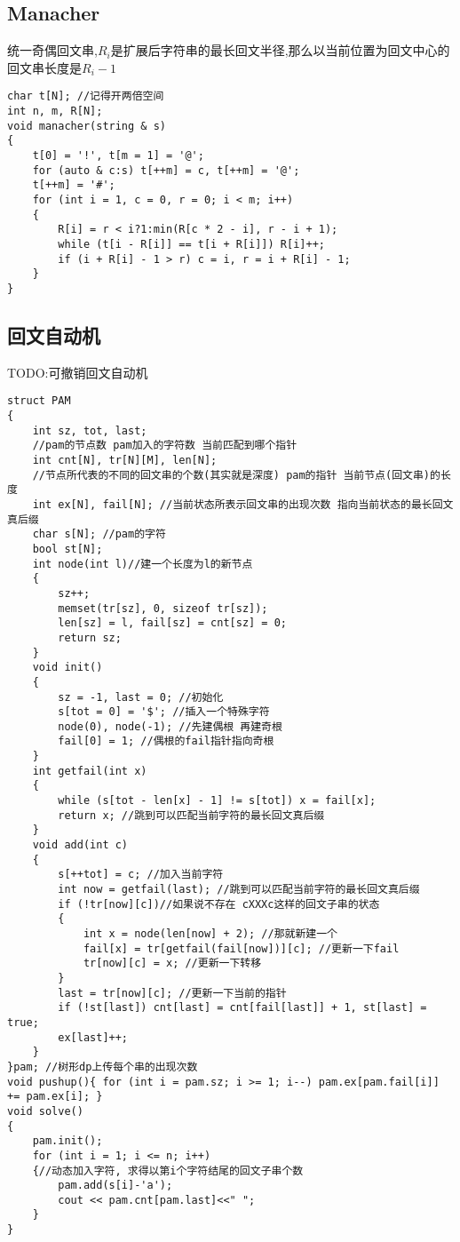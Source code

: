 \documentclass[a4paper, fontset=none]{ctexart}
\begin{document}
\subsection{Manacher}

统一奇偶回文串,$R_i$是扩展后字符串的最长回文半径,那么以当前位置为回文中心的回文串长度是$R_i-1$

\begin{verbatim}
char t[N]; //记得开两倍空间
int n, m, R[N];
void manacher(string & s)
{
    t[0] = '!', t[m = 1] = '@';
    for (auto & c:s) t[++m] = c, t[++m] = '@';
    t[++m] = '#';
    for (int i = 1, c = 0, r = 0; i < m; i++)
    {
        R[i] = r < i?1:min(R[c * 2 - i], r - i + 1);
        while (t[i - R[i]] == t[i + R[i]]) R[i]++;
        if (i + R[i] - 1 > r) c = i, r = i + R[i] - 1;
    }
}
\end{verbatim}
\subsection{回文自动机}

TODO:可撤销回文自动机

\begin{verbatim}
struct PAM
{
    int sz, tot, last;
    //pam的节点数 pam加入的字符数 当前匹配到哪个指针
    int cnt[N], tr[N][M], len[N];
    //节点所代表的不同的回文串的个数(其实就是深度) pam的指针 当前节点(回文串)的长度
    int ex[N], fail[N]; //当前状态所表示回文串的出现次数 指向当前状态的最长回文真后缀
    char s[N]; //pam的字符
    bool st[N];
    int node(int l)//建一个长度为l的新节点
    {
        sz++;
        memset(tr[sz], 0, sizeof tr[sz]);
        len[sz] = l, fail[sz] = cnt[sz] = 0;
        return sz;
    }
    void init()
    {
        sz = -1, last = 0; //初始化
        s[tot = 0] = '$'; //插入一个特殊字符
        node(0), node(-1); //先建偶根 再建奇根
        fail[0] = 1; //偶根的fail指针指向奇根
    }
    int getfail(int x)
    {
        while (s[tot - len[x] - 1] != s[tot]) x = fail[x];
        return x; //跳到可以匹配当前字符的最长回文真后缀
    }
    void add(int c)
    {
        s[++tot] = c; //加入当前字符
        int now = getfail(last); //跳到可以匹配当前字符的最长回文真后缀
        if (!tr[now][c])//如果说不存在 cXXXc这样的回文子串的状态
        {
            int x = node(len[now] + 2); //那就新建一个
            fail[x] = tr[getfail(fail[now])][c]; //更新一下fail
            tr[now][c] = x; //更新一下转移
        }
        last = tr[now][c]; //更新一下当前的指针
        if (!st[last]) cnt[last] = cnt[fail[last]] + 1, st[last] = true;
        ex[last]++;
    }
}pam; //树形dp上传每个串的出现次数
void pushup(){ for (int i = pam.sz; i >= 1; i--) pam.ex[pam.fail[i]] += pam.ex[i]; }
void solve()
{
    pam.init();
    for (int i = 1; i <= n; i++)
    {//动态加入字符, 求得以第i个字符结尾的回文子串个数
        pam.add(s[i]-'a');
        cout << pam.cnt[pam.last]<<" ";
    }
}
\end{verbatim}
\end{document}
